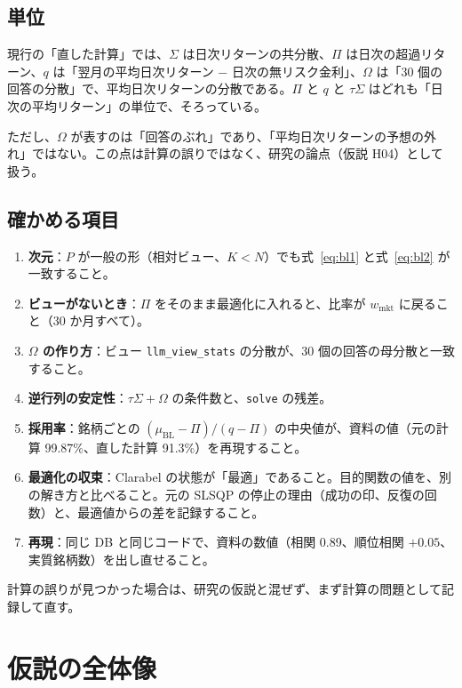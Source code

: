 \documentclass[xelatex,ja=standard,jafont=haranoaji,a4paper,10pt,openany]{bxjsreport}
\newcommand{\code}[1]{\texttt{#1}}
\newcommand{\muBL}{\mu_{\mathrm{BL}}}
\newcommand{\wmkt}{w_{\mathrm{mkt}}}
\begin{document}
\section{単位}

現行の「直した計算」では、$\Sigma$ は日次リターンの共分散、$\Pi$ は日次の超過リターン、$q$ は「翌月の平均日次リターン $-$ 日次の無リスク金利」、$\Omega$ は「30 個の回答の分散」で、平均日次リターンの分散である。$\Pi$ と $q$ と $\tau\Sigma$ はどれも「日次の平均リターン」の単位で、そろっている。

ただし、$\Omega$ が表すのは「回答のぶれ」であり、「平均日次リターンの予想の外れ」ではない。この点は計算の誤りではなく、研究の論点（仮説 H04）として扱う。

\section{確かめる項目}

\begin{enumerate}
\item \textbf{次元}：$P$ が一般の形（相対ビュー、$K<N$）でも式~\eqref{eq:bl1} と式~\eqref{eq:bl2} が一致すること。
\item \textbf{ビューがないとき}：$\Pi$ をそのまま最適化に入れると、比率が $\wmkt$ に戻ること（30 か月すべて）。
\item \textbf{$\Omega$ の作り方}：ビュー \code{llm\_view\_stats} の分散が、30 個の回答の母分散と一致すること。
\item \textbf{逆行列の安定性}：$\tau\Sigma+\Omega$ の条件数と、\code{solve} の残差。
\item \textbf{採用率}：銘柄ごとの $(\muBL-\Pi)/(q-\Pi)$ の中央値が、資料の値（元の計算 99.87\%、直した計算 91.3\%）を再現すること。
\item \textbf{最適化の収束}：Clarabel の状態が「最適」であること。目的関数の値を、別の解き方と比べること。元の SLSQP の停止の理由（成功の印、反復の回数）と、最適値からの差を記録すること。
\item \textbf{再現}：同じ DB と同じコードで、資料の数値（相関 0.89、順位相関 $+0.05$、実質銘柄数）を出し直せること。
\end{enumerate}

計算の誤りが見つかった場合は、研究の仮説と混ぜず、まず計算の問題として記録して直す。

\chapter{仮説の全体像}\label{ch:overview}
\end{document}
